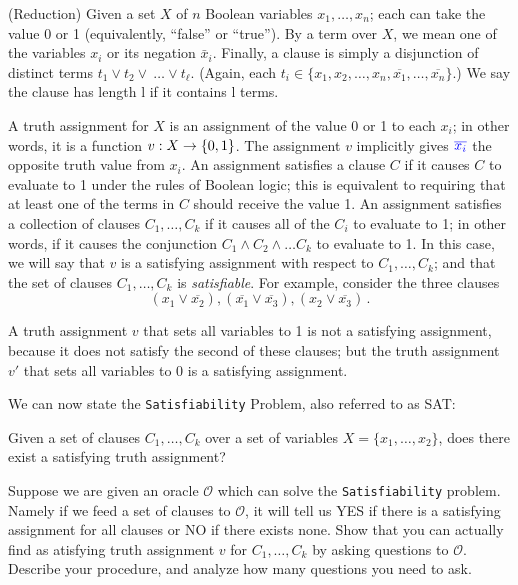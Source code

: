 \begin{questions}
\question[10] (Reduction) Given a set $X$ of $n$ Boolean variables
  $x_1,\ldots,x_n$; each can take the value 0 or 1 (equivalently,
  ``false'' or ``true''). By a term over $X$, we mean one of the
  variables $x_i$ or its negation $\bar x_i$. Finally, a clause is
  simply a disjunction of distinct terms
  $t_1 \vee t_2 \vee \ \ldots \vee t_\ell $.  (Again, each
  $t_i \in \{x_1, x_2,\ldots,x_n, \overline{x_1},\ldots,
  \overline{x_n}\}$.) We say the clause has length l if it contains l
  terms.

  A truth assignment for $X$ is an assignment of the value 0 or 1 to
  each $x_i$; in other words, it is a function $v: X \to \{0,1\}$. The
  assignment $v$ implicitly gives ${\color{blue}{\overline{x_i}}}$ the opposite truth
  value from $x_i$. An assignment satisfies a clause $C$ if it causes
  $C$ to evaluate to 1 under the rules of Boolean logic; this is
  equivalent to requiring that at least one of the terms in $C$ should
  receive the value 1. An assignment satisfies a collection of clauses
  $C_1,\ldots, C_k$ if it causes all of the $C_i$ to evaluate to 1; in
  other words, if it causes the conjunction
  $C_1 \wedge C_2 \wedge \ldots C_k$ to evaluate to 1. In this case,
  we will say that $v$ is a satisfying assignment with respect to
  $C_1,\ldots,C_k$; and that the set of clauses $C_1,\ldots,C_k$ is
  \emph{satisfiable}. For example, consider the three clauses
  \[(x_1 \vee \overline{x_2}), (\overline{x_1} \vee \overline{x_3}),
    (x_2 \vee \overline{x_3}) \, .\]

  A truth assignment $v$ that sets all variables to 1 is not a
  satisfying assignment, because it does not satisfy the second of
  these clauses; but the truth assignment $v'$ that sets all variables
  to 0 is a satisfying assignment.

  We can now state the \texttt{Satisfiability} Problem, also referred
  to as SAT:
  \begin{center}
    Given a set of clauses $C_1, \ldots, C_k$ over a set of variables
    $X = \{ x_1, \ldots, x_2\}$, does there exist a satisfying truth
    assignment?
    \end{center}

    Suppose we are given an oracle $\mathcal{O}$ which can solve the
    \texttt{Satisfiability} problem. Namely if we feed a set of
    clauses to $\mathcal{O}$, it will tell us YES if there is a
    satisfying assignment for all clauses or NO if there exists
    none. Show that you can actually find as atisfying truth
    assignment $v$ for $C_1,\ldots,C_k$ by asking questions to
    $\mathcal{O}$. Describe your procedure, and analyze how many
    questions you need to ask.
\end{questions}



